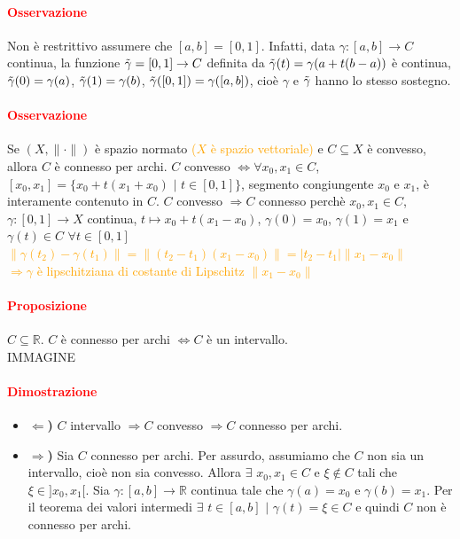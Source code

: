 \documentclass{article}
\newcommand{\R}{\mathbb{R}}
\begin{document}
\paragraph{\textcolor{red}{Osservazione}}
Non è restrittivo assumere che $[a,b]=[0,1]$. Infatti, data $\gamma:[a,b]\rightarrow C$ continua, la funzione $\Tilde{\gamma}=[0,1]\rightarrow C$ definita da $\Tilde{\gamma}(t)=\gamma(a+t(b-a))$ è continua, $\Tilde{\gamma} (0)=\gamma(a)$, $\Tilde{\gamma}(1)=\gamma(b)$, $\Tilde{\gamma}([0,1])=\gamma([a,b])$, cioè $\gamma$ e $\Tilde{\gamma}$ hanno lo stesso sostegno.

\paragraph{\textcolor{red}{Osservazione}}
Se $(X, \|\cdot\|)$ è spazio normato \textcolor{orange}{($X$ è spazio vettoriale)} e $C \subseteq X$ è convesso, allora $C$ è connesso per archi. $C$ convesso $\Leftrightarrow \forall x_0,x_1\in C$, $[x_0,x_1]=\{x_0+t(x_1+x_0)\,\,|\,\,t \in [0,1]\}$, segmento congiungente $x_0$ e $x_1$, è interamente contenuto in $C$. $C$ convesso $\Rightarrow C$ connesso perchè $x_0, x_1 \in C$, $\gamma:[0,1]\rightarrow X$ continua, $t \mapsto x_0+t(x_1-x_0)$, $\gamma(0)=x_0$, $\gamma(1)=x_1$ e $\gamma(t)\in C$ $\forall t \in [0,1]$ \\
\textcolor{orange}{$\|\gamma(t_2)-\gamma(t_1)\|=\|(t_2-t_1)(x_1-x_0)\|=|t_2-t_1|\|x_1-x_0\|$\\
$\Rightarrow \gamma$ è lipschitziana di costante di Lipschitz $\|x_1-x_0\|$}

\paragraph{\textcolor{red}{Proposizione}}
$C \subseteq \R$. $C$ è connesso per archi $\Leftrightarrow C$ è un intervallo.\\
IMMAGINE

\paragraph{\textcolor{red}{Dimostrazione}} 
\begin{itemize}
    \item \textbf{$\Leftarrow$)} $C$ intervallo $\Rightarrow C$ convesso $\Rightarrow C$ connesso per archi.
    \item \textbf{$\Rightarrow$)} Sia $C$ connesso per archi. Per assurdo, assumiamo che $C$ non sia un intervallo, cioè non sia convesso. Allora $\exists\,\, x_0,x_1 \in C$ e $\xi \notin C$ tali che $\xi \in ]x_0,x_1[$. Sia $\gamma:[a,b]\rightarrow \R$ continua tale che $\gamma(a)=x_0$ e $\gamma(b)=x_1$. Per il teorema dei valori intermedi $\exists\,\, t \in [a,b]\,\, |\,\, \gamma(t)=\xi \in C$ e quindi $C$ non è connesso per archi.
\end{itemize}
\begin{flushright}
\large\Lightning
\end{flushright}
\end{document}
